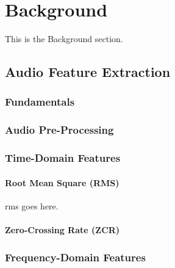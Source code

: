 
\section{Background}
\label{sec:background}
This is the Background section.

\subsection{Audio Feature Extraction}
\label{subsec:feature_extraction}

\subsubsection{Fundamentals}
\label{subsubsec:feature_fundamentals}

\subsubsection{Audio Pre-Processing}
\label{subsubsec:preprocessing}

\subsubsection{Time-Domain Features}
\label{subsubsec:temporal_features}



\paragraph{Root Mean Square (RMS)}
\label{para:rms}
\gls{rms} goes here.

\paragraph{Zero-Crossing Rate (ZCR)}
\label{para:zcr}

\subsubsection{Frequency-Domain Features}
\label{subsubsec:spectral_features}

